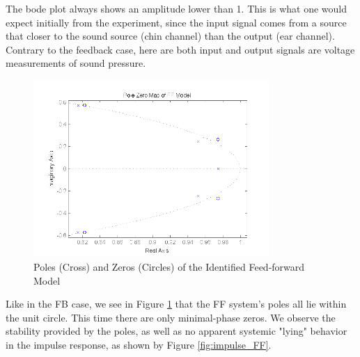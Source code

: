 The bode plot always shows an amplitude lower than 1. This is what one would expect initially from the experiment, since the input signal comes from a source that closer to the sound source (chin channel) than the output (ear channel). Contrary to the feedback case, here are both input and output signals are voltage measurements of sound pressure.\\

\begin{figure}[h]
\centering
\includegraphics[width=0.8\textwidth]{pics/pole_FF}
\caption{Poles (Cross) and Zeros (Circles) of the Identified Feed-forward Model}
\label{fig:pole_FF}
\end{figure}

Like in the FB case, we see in Figure \ref{fig:pole_FF} that the FF system's poles all lie within the unit circle. This time there are only minimal-phase zeros. We observe the stability provided by the poles, as well as no apparent systemic "lying" behavior in the impulse response, as shown by Figure \ref{fig:impulse_FF}. \\

